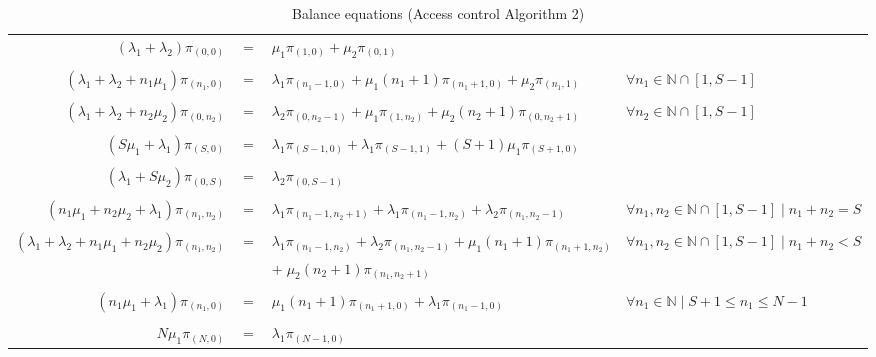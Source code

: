 \documentclass[10pt,a4paper]{article}
\begin{document}
\begin{table}[h!]
    \caption{Balance equations (Access control Algorithm 2)}
    \centering
    \small
    \begin{adjustbox}{center=\textwidth}
    \label{table:ALG2-CloudletBalanceEquationList}
     \begin{tabular}{rcll}

      \toprule

      $(\lambda_1 + \lambda_2)\pi_{(0,0)}$ & $=$ & $\mu_1\pi_{(1,0)} + \mu_2\pi_{(0,1)}$ \\\\
       
      $(\lambda_1 + \lambda_2 + n_1\mu_1)\pi_{(n_1,0)} $ & $=$ & $ \lambda_1\pi_{(n_1-1,0)} + \mu_1(n_1+1)\pi_{(n_1+1,0)} + \mu_2\pi_{(n_1,1)}$ & $\forall n_1 \in \mathbb{N} \cap [1, S-1]$ \\\\
      
      $(\lambda_1 + \lambda_2 + n_2\mu_2)\pi_{(0,n_2)} $ & $=$ & $ \lambda_2\pi_{(0,n_2-1)} + \mu_1\pi_{(1,n_2)} + \mu_2(n_2+1)\pi_{(0,n_2+1)}$ & $ \forall n_2 \in \mathbb{N} \cap [1, S-1]$ \\\\
      
      $(S\mu_1+\lambda_1)\pi_{(S,0)}$ & $=$ & $\lambda_1\pi_{(S-1,0)} + \lambda_1\pi_{(S-1,1)} + (S+1)\mu_1 \pi_{(S+1,0)}$ \\\\
      
      $(\lambda_1 + S\mu_2) \pi_{(0,S)}$ & $=$ & $\lambda_2\pi_{(0,S-1)}$ \\\\
      
      $(n_1\mu_1 + n_2\mu_2 + \lambda_1)\pi_{(n_1,n_2)} $ & $=$ & $ \lambda_1\pi_{(n_1-1,n_2+1)} + \lambda_1\pi_{(n_1-1,n_2)} + \lambda_2\pi_{(n_1,n_2-1)}$ & $\forall n_1,n_2 \in \mathbb{N} \cap [1, S-1] \mid n_1 + n_2 = S $ \\\\
      
      $(\lambda_1 + \lambda_2 + n_1\mu_1 + n_2\mu_2)\pi_{(n_1,n_2)} $ & $=$ & $ \lambda_1\pi_{(n_1-1,n_2)} + \lambda_2\pi_{(n_1,n_2-1)} + \mu_1(n_1+1)\pi_{(n_1+1,n_2)} $ & $\forall n_1,n_2 \in \mathbb{N} \cap [1, S-1] \mid n_1 + n_2 < S$\\
      && $+\; \mu_2(n_2+1)\pi_{(n_1,n_2+1)}$ & \\\\
      
      $(n_1\mu_1 + \lambda_1)\pi_{(n_1,0)}$ & = & $\mu_1(n_1+1)\pi_{(n_1+1,0)} + \lambda_1\pi_{(n_1-1,0)}$ & $\forall n_1 \in \mathbb{N} \mid S+1 \leq n_1 \leq N-1$ \\\\

      $N\mu_1\pi_{(N,0)}$ & = & $\lambda_1\pi_{(N-1,0)}$ \\
      
      \bottomrule

    \end{tabular}
    \end{adjustbox}
\end{table}
\end{document}
